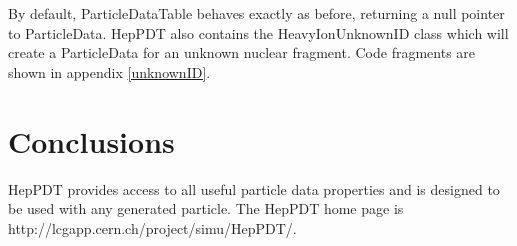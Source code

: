 By default, ParticleDataTable behaves exactly as before, 
returning a null pointer to ParticleData.  HepPDT also contains the
HeavyIonUnknownID class which will create a ParticleData for an unknown
nuclear fragment.  Code fragments are shown in appendix \ref{unknownID}.

\section{Conclusions}

HepPDT provides access to all useful particle data properties
and is designed to be used with any generated particle.    
The HepPDT home page is http://lcgapp.cern.ch/project/simu/HepPDT/.
